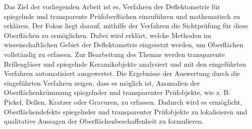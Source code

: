 Das Ziel der vorliegenden Arbeit ist es, Verfahren der Deflektometrie für spiegelnde und transparente Prüfoberflächen einzuführen und mathematisch zu erklären.
Der Fokus liegt darauf, mithilfe der Verfahren die Sichtprüfung für diese Oberflächen zu ermöglichen.
Dabei wird erklärt, welche Methoden im wissenschaftlichen Gebiet der Deflektometrie eingesetzt werden, um Oberflächen vollständig zu erfassen.
Zur Bearbeitung des Themas werden transparente Brillengläser und spiegelnde Keramikobjekte analysiert und mit den eingeführten Verfahren automatisiert ausgewertet.
Die Ergebnisse der Auswertung durch die eingeführten Verfahren zeigen, dass es möglich ist, Anomalien der Oberflächenkrümmung spiegelnder und transparenter Prüfobjekte, wie z. B. Pickel, Dellen, Kratzer oder Gravuren, zu erfassen.
Dadurch wird es ermöglicht, Oberflächendefekte spiegelnder und transparenter Prüfobjekte zu lokalisieren und qualitative Aussagen der Oberflächenbeschaffenheit zu formulieren.